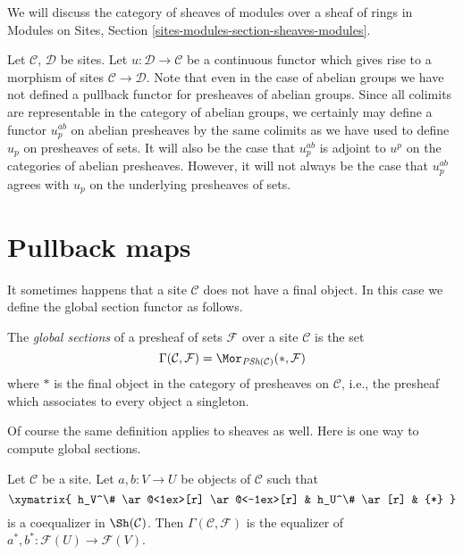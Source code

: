 \noindent
We will discuss the category of sheaves of modules over a sheaf of rings in
Modules on Sites, Section \ref{sites-modules-section-sheaves-modules}.

\begin{remark}
\label{remark-no-pullback-presheaves}
Let $\mathcal{C}$, $\mathcal{D}$ be sites.
Let $u : \mathcal{D} \to \mathcal{C}$ be a continuous functor
which gives rise to a morphism of sites $\mathcal{C} \to \mathcal{D}$.
Note that even in the case of abelian groups we have not defined
a pullback functor for presheaves of abelian groups.
Since all colimits are representable in
the category of abelian groups, we certainly may define
a functor $u_p^{ab}$ on abelian presheaves by the same colimits
as we have used to define $u_p$ on presheaves of sets.
It will also be the case that $u_p^{ab}$ is adjoint to
$u^p$ on the categories of abelian presheaves.
However, it will not always be the case that $u_p^{ab}$
agrees with $u_p$ on the underlying presheaves of sets.
\end{remark}












\section{Pullback maps}
\label{section-pullback}

\noindent
It sometimes happens that a site $\mathcal{C}$ does
not have a final object. In this case we define the
global section functor as follows.

\begin{definition}
\label{definition-global-sections}
The {\it global sections} of a presheaf of sets $\mathcal{F}$ over a
site $\mathcal{C}$ is the set
$$
\Gamma(\mathcal{C}, \mathcal{F}) =
\Mor_{\textit{PSh}(\mathcal{C})}(*, \mathcal{F})
$$
where $*$ is the final object in the category of presheaves on
$\mathcal{C}$, i.e., the presheaf which associates to every object
a singleton.
\end{definition}

\noindent
Of course the same definition applies to sheaves as well.
Here is one way to compute global sections.

\begin{lemma}
\label{lemma-compute-global-sections}
Let $\mathcal{C}$ be a site. Let $a, b : V \to U$ be objects of $\mathcal{C}$
such that
$$
\xymatrix{
h_V^\# \ar@<1ex>[r] \ar@<-1ex>[r] & h_U^\# \ar[r] & {*}
}
$$
is a coequalizer in $\Sh(\mathcal{C})$. Then
$\Gamma(\mathcal{C}, \mathcal{F})$ is the equalizer of
$a^*, b^* : \mathcal{F}(U) \to \mathcal{F}(V)$.
\end{lemma}

